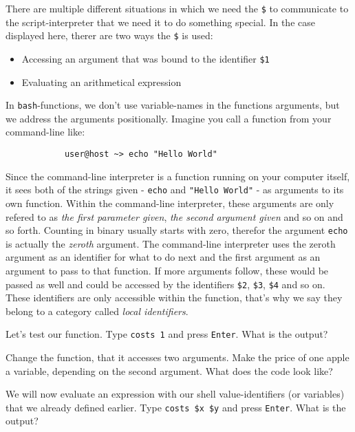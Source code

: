 \begin{challenge}
\begin{task}
\begin{itemize}
        \end{itemize}
        There are multiple different situations in which we need the \texttt{\$} to communicate to the script-interpreter that we need it to do something special. 
        In the case displayed here, therer are two ways the \texttt{\$} is used:
        \begin{itemize}
            \item Accessing an argument that was bound to the identifier \texttt{\$1} 
            \item Evaluating an arithmetical expression
        \end{itemize}
        In \texttt{bash}-functions, we don't use variable-names in the functions arguments, but we address the arguments positionally. 
        Imagine you call a function from your command-line like:
        \begin{lstlisting}
            user@host ~> echo "Hello World"
        \end{lstlisting}
        Since the command-line interpreter is a function running on your computer itself, it sees both of the strings given - \texttt{echo} and \texttt{"Hello World"} - as arguments to its own function. 
        Within the command-line interpreter, these arguments are only refered to as \textit{the first parameter given}, \textit{the second argument given} and so on and so forth. 
        Counting in binary usually starts with zero, therefor the argument \texttt{echo} is actually the \textit{zeroth} argument. 
        The command-line interpreter uses the zeroth argument as an identifier for what to do next and the first argument as an argument to pass to that function. 
        If more arguments follow, these would be passed as well and could be accessed by the identifiers \texttt{\$2}, \texttt{\$3}, \texttt{\$4} and so on.
        These identifiers are only accessible within the function, that's why we say they belong to a category called \textit{local identifiers}.
        \begin{questions}
            \item Let's test our function. Type \texttt{costs 1} and press \texttt{Enter}. What is the output?
            \item Change the function, that it accesses two arguments. Make the price of one apple a variable, depending on the second argument. What does the code look like?
            \item We will now evaluate an expression with our shell value-identifiers (or variables) that we already defined earlier. Type \texttt{costs \$x \$y} and press \texttt{Enter}. What is the output?
        \end{questions}
    \end{task}


\end{challenge}
